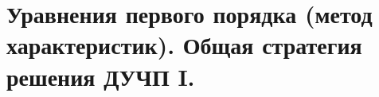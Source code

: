 \section{Уравнения первого порядка (метод характеристик). Общая стратегия
решения ДУЧП I.}

\newpage
